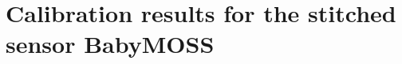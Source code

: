 %
\chapter{Calibration results for the stitched sensor BabyMOSS}
\label{chap:babymoss-results}
%
\textcolor{red}{\blindtext}